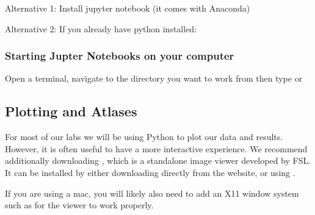 \documentclass[letterpaper,10pt,english]{sphinxmanual}
\begin{document}
Alternative 1: Install jupyter notebook (it comes with Anaconda)

\begin{sphinxVerbatim}[commandchars=\\\{\}]
  
\end{sphinxVerbatim}

Alternative 2: If you already have python installed:

\begin{sphinxVerbatim}[commandchars=\\\{\}]
   
\end{sphinxVerbatim}

\begin{sphinxVerbatim}[commandchars=\\\{\}]
  
\end{sphinxVerbatim}


\subsubsection{Starting Jupter Notebooks on your computer}
\label{\detokenize{content/Introduction_to_JupyterHub:starting-jupter-notebooks-on-your-computer}}
Open a terminal, navigate to the directory you want to work from then type  or 


\subsection{Plotting and Atlases}
\label{\detokenize{content/Introduction_to_JupyterHub:plotting-and-atlases}}
For most of our labs we will be using Python to plot our data and results.  However, it is often useful to have a more interactive experience.  We recommend additionally downloading , which is a standalone image viewer developed by FSL.  It can be installed by either downloading directly from the website, or using .


If you are using a mac, you will likely also need to add an X11 window system such as  for the viewer to work properly.
\end{document}
